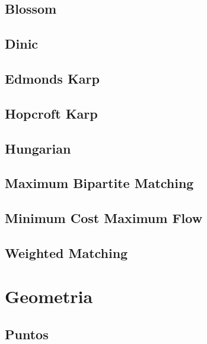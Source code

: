 \subsection{Blossom}
\raggedbottom
\hrulefill
\subsection{Dinic}
\raggedbottom
\hrulefill
\subsection{Edmonds Karp}
\raggedbottom
\hrulefill
\subsection{Hopcroft Karp}
\raggedbottom
\hrulefill
\subsection{Hungarian}
\raggedbottom
\hrulefill
\subsection{Maximum Bipartite Matching}
\raggedbottom
\hrulefill
\subsection{Minimum Cost Maximum Flow}
\raggedbottom
\hrulefill
\subsection{Weighted Matching}
\raggedbottom
\hrulefill

\section{Geometria}
\subsection{Puntos}
\raggedbottom
\hrulefill
